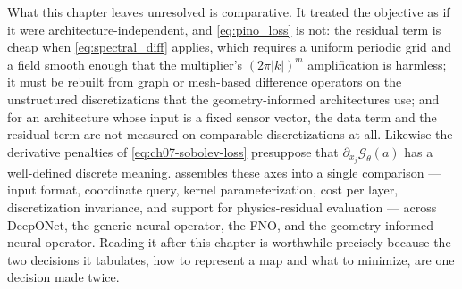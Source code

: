 
What this chapter leaves unresolved is comparative. It treated the objective as if it were
architecture-independent, and \eqref{eq:pino_loss} is not: the residual term is cheap when
\eqref{eq:spectral_diff} applies, which requires a uniform periodic grid and a field smooth
enough that the multiplier's $(2\pi|k|)^m$ amplification is harmless; it must be rebuilt from
graph or mesh-based difference operators on the unstructured discretizations that the
geometry-informed architectures use; and for an architecture whose input is a fixed sensor
vector, the data term and the residual term are not measured on comparable discretizations at
all. Likewise the derivative penalties of \eqref{eq:ch07-sobolev-loss} presuppose that
$\partial_{x_j}\mathcal{G}_\theta(a)$ has a well-defined discrete meaning. 
assembles these axes into a single comparison --- input format, coordinate query, kernel
parameterization, cost per layer, discretization invariance, and support for physics-residual
evaluation --- across DeepONet, the generic neural operator, the FNO, and the geometry-informed
neural operator. Reading it after this chapter is worthwhile precisely because the two
decisions it tabulates, how to represent a map and what to minimize, are one decision made
twice.

